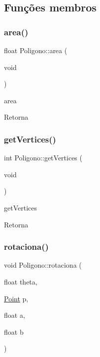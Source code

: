 \subsection{Funções membros}
\mbox{\label{class_poligono_a9b7cb6c339f78a5b9432494d8f94816c}} 
\subsubsection{\texorpdfstring{area()}{area()}}
{\footnotesize\ttfamily float Poligono\+::area (\begin{DoxyParamCaption}\item[{void}]{ }\end{DoxyParamCaption})}



area 

\begin{DoxyReturn}{Retorna}

\end{DoxyReturn}
\mbox{\label{class_poligono_a26a3c5ded9660c3389f9a9535700fa5d}} 
\subsubsection{\texorpdfstring{get\+Vertices()}{getVertices()}}
{\footnotesize\ttfamily int Poligono\+::get\+Vertices (\begin{DoxyParamCaption}\item[{void}]{ }\end{DoxyParamCaption})}



get\+Vertices 

\begin{DoxyReturn}{Retorna}

\end{DoxyReturn}
\mbox{\label{class_poligono_ab50d539e92a775b56c4b70ff52830516}} 
\subsubsection{\texorpdfstring{rotaciona()}{rotaciona()}}
{\footnotesize\ttfamily void Poligono\+::rotaciona (\begin{DoxyParamCaption}\item[{float}]{theta,  }\item[{\mbox{\hyperlink{class_point}{Point}}}]{p,  }\item[{float}]{a,  }\item[{float}]{b }\end{DoxyParamCaption})}



